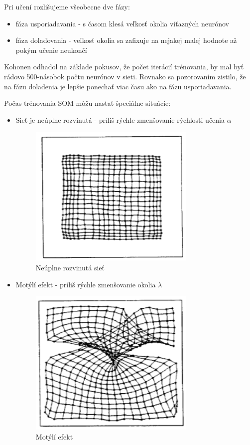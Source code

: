 Pri učení rozlišujeme všeobecne dve fázy:
\begin{itemize}
	\item fáza usporiadavania - s časom klesá veľkosť okolia víťazných neurónov 
	\item fáza dolaďovania - veľkosť okolia sa zafixuje na nejakej malej hodnote až pokým učenie neukončí
\end{itemize}

Kohonen odhadol na základe pokusov, že počet iterácií trénovania, by mal byť rádovo 500-násobok počtu neurónov v sieti.
Rovnako sa pozorovaním zistilo, že na fázu doladenia je lepšie ponechať viac času ako na fázu usporiadavania.

Počas trénovania SOM môžu nastať špeciálne situácie:

\begin{itemize}
	\item Sieť je neúplne rozvinutá - príliš rýchle zmenšovanie rýchlosti učenia $\alpha$
	\begin{figure}[H]
		\centering
		\includegraphics[width=8cm]{assets/too_fast}
		\caption{Neúplne rozvinutá sieť}
	\end{figure}
	
	\item Motýlí efekt - príliš rýchle zmenšovanie okolia $\lambda$
	\begin{figure}[H]
		\centering
		\includegraphics[width=8cm]{assets/butterfly_effect}
		\caption{Motýlí efekt}
	\end{figure}
	

\end{itemize}

